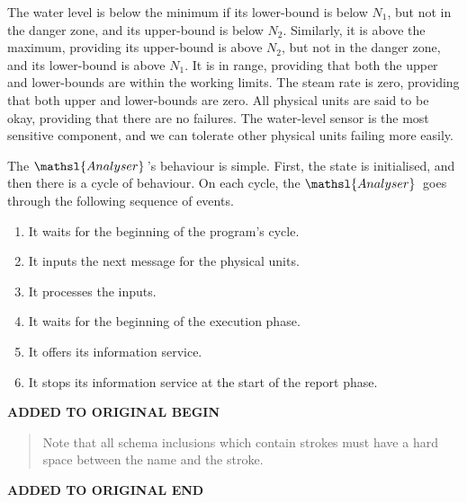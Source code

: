 \documentclass{report}
\newcommand{\compresslist}{\itemsep=0pt \parskip=0pt}
\newenvironment{addedstuff}{\begin{flushleft}\textbf{ADDED TO ORIGINAL BEGIN}\begin{quote}\begin{minipage}{.8\textwidth}}{\end{minipage}\end{quote}\textbf{ADDED TO ORIGINAL END}\end{flushleft}}
\begin{document}
The water level is below the minimum if its lower-bound is below \(
N_1 \), but not in the danger zone, and its upper-bound is below \(
N_2 \). Similarly, it is above the maximum, providing its upper-bound is above
\( N_2 \), but not in the danger zone, and its lower-bound is above \(
N_1 \). It is in range, providing that both the upper and lower-bounds are
within the working limits. The steam rate is zero, providing that both upper and lower-bounds are
zero. All physical units are said to be okay, providing that there are no
failures. The water-level sensor is the most sensitive component, and we can
tolerate other physical units failing more easily.

The \( \mathsl{Analyser} \, \)'s behaviour is simple.  First, the
state is initialised, and then there is a cycle of behaviour.  On each
cycle, the \( \mathsl{Analyser} \, \)\/ goes through the following
sequence of events.
\begin{enumerate}\compresslist
\item It waits for the beginning of the program's cycle.
\item It inputs the next message for the physical units.
\item It processes the inputs.
\item It waits for the beginning of the execution phase.
\item It offers its information service.
\item It stops its information service at the start of the report
  phase.
\end{enumerate}

\begin{addedstuff}
   Note that all schema inclusions which contain strokes must have a hard space between the name and the stroke.
\end{addedstuff}
\end{document}
